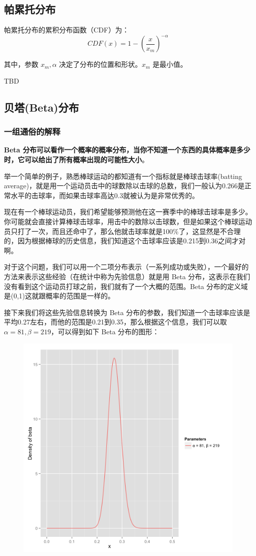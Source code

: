 \documentclass[12pt]{article}
\begin{document}
\subsection{帕累托分布\cite{Think_Stats}}
帕累托分布的累积分布函数（CDF）为：
$$
CDF(x) = 1 - (\frac{x}{x_m})^{-\alpha}
$$

其中，参数 $x_m, \alpha$ 决定了分布的位置和形状。$x_m$ 是最小值。

TBD

\subsection{贝塔(Beta)分布}
\subsubsection{一组通俗的解释\cite{Commonly_Understand_Beta_Distribution}}
\textbf{Beta 分布可以看作一个概率的概率分布，当你不知道一个东西的具体概率是多少时，它可以给出了所有概率出现的可能性大小}。

举一个简单的例子，熟悉棒球运动的都知道有一个指标就是棒球击球率(batting average)，就是用一个运动员击中的球数除以击球的总数，我们一般认为0.266是正常水平的击球率，而如果击球率高达0.3就被认为是非常优秀的。

现在有一个棒球运动员，我们希望能够预测他在这一赛季中的棒球击球率是多少。你可能就会直接计算棒球击球率，用击中的数除以击球数，但是如果这个棒球运动员只打了一次，而且还命中了，那么他就击球率就是100\%了，这显然是不合理的，因为根据棒球的历史信息，我们知道这个击球率应该是0.215到0.36之间才对啊。

对于这个问题，我们可以用一个二项分布表示（一系列成功或失败），一个最好的方法来表示这些经验（在统计中称为先验信息）就是用 Beta 分布，这表示在我们没有看到这个运动员打球之前，我们就有了一个大概的范围。Beta 分布的定义域是(0,1)这就跟概率的范围是一样的。

接下来我们将这些先验信息转换为 Beta 分布的参数，我们知道一个击球率应该是平均0.27左右，而他的范围是0.21到0.35，那么根据这个信息，我们可以取$\alpha=81, \beta=219$，可以得到如下 Beta 分布的图形：
\begin{figure}[H]
  \centering
  \includegraphics[width=.5\textwidth]{fig/Beta_Distribution_Example_1.png} 
\end{figure}
\end{document}
